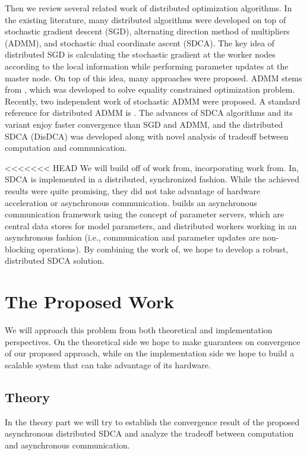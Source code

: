 \documentclass{article}
\begin{document}
Then we review several related work of distributed optimization algorithms. In the existing literature, many distributed algorithms were developed on top of stochastic gradient descent (SGD), alternating direction method of multipliers (ADMM), and stochastic dual coordinate ascent (SDCA). The key idea of distributed SGD is calculating the stochastic gradient at the worker nodes according to the local information while performing parameter updates at the master node. On top of this idea, many approaches were proposed\cite{zinkevich2010parallelized,recht2011hogwild,agarwal2011distributed}. ADMM stems from \cite{gabay1976dual}, which was developed to solve equality constrained optimization problem. Recently, two independent work of stochastic ADMM were proposed\cite{ouyang2013stochastic,suzuki2013dual}. A standard reference for distributed ADMM is \cite{boyd2011distributed}. The advances of SDCA algorithms\cite{shalev2013stochastic} and its variant\cite{shalev2013accelerated,shalev2014accelerated,lin2014accelerated} enjoy faster convergence than SGD and ADMM, and the distributed SDCA (DisDCA)\cite{yang2013trading,yang2013analysis} was developed along with novel analysis of tradeoff between computation and communication.

<<<<<<< HEAD
We will build off of work from\cite{yang2013trading}, incorporating work
from\cite{li2014scaling}. In\cite{yang2013trading}, SDCA is implemented in a
distributed, synchronized fashion. While the achieved results were quite
promising, they did not take advantage of hardware acceleration or asynchronous
communication.  \cite{li2014scaling} builds an asynchronous communication
framework using the concept of parameter servers, which are central data stores
for model parameters, and distributed workers working in an asynchronous fashion
(i.e., communication and parameter updates are non-blocking operations). By
combining the work of\cite{yang2013trading}\cite{li2014scaling}, we hope to
develop a robust, distributed SDCA solution.

\section{The Proposed Work}
We will approach this problem from both theoretical and implementation
perspectives. On the theoretical side we hope to make guarantees on convergence
of our proposed approach, while on the implementation side we hope to build a
scalable system that can take advantage of its hardware.

\subsection{Theory}
In the theory part we will try to establish the convergence result of the
proposed asynchronous distributed SDCA and analyze the tradeoff between
computation and asynchronous communication.
\end{document}

